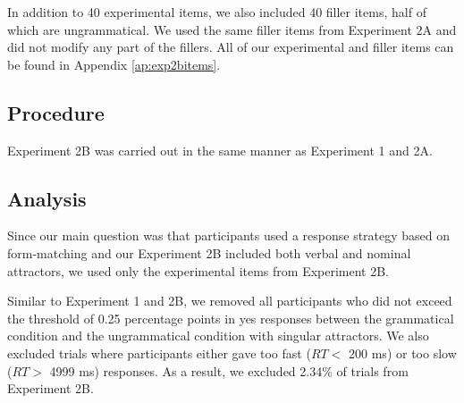     \z
\z

In addition to 40 experimental items, we also included 40 filler items, half of which are ungrammatical. We used the same filler items from Experiment 2A and did not modify any part of the fillers. All of our experimental and filler items can be found in Appendix \ref{ap:exp2bitems}.

\subsection{Procedure}

Experiment 2B was carried out in the same manner as Experiment 1 and 2A. 

\subsection{Analysis}

Since our main question was that participants used a response strategy based on form-matching and our Experiment 2B included both verbal and nominal attractors, we used only the experimental items from Experiment 2B. 

Similar to Experiment 1 and 2B, we removed all participants who did not exceed the threshold of 0.25 percentage points in yes responses between the grammatical condition and the ungrammatical condition with singular attractors. We also excluded trials where participants either gave too fast ($RT < $ 200 ms) or too slow ($RT > $ 4999 ms) responses. As a result, we excluded 2.34\% of trials from Experiment 2B.

